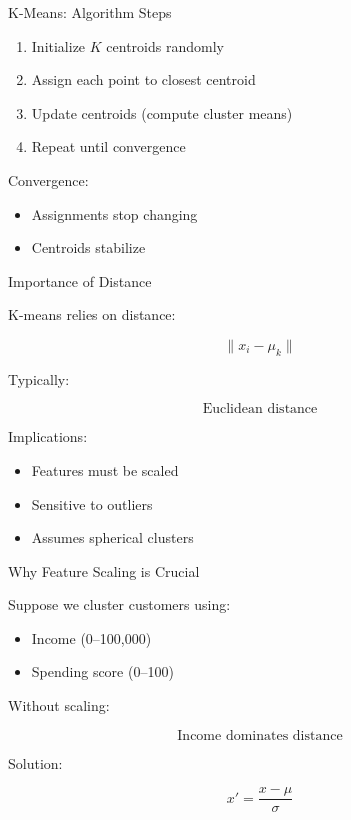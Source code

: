 \documentclass{beamer}
\begin{document}
\begin{frame}{K-Means: Algorithm Steps}

\begin{enumerate}
    \item Initialize $K$ centroids randomly
    \item Assign each point to closest centroid
    \item Update centroids (compute cluster means)
    \item Repeat until convergence
\end{enumerate}

\vspace{0.5cm}

Convergence:

\begin{itemize}
    \item Assignments stop changing
    \item Centroids stabilize
\end{itemize}

\end{frame}

\begin{frame}{Importance of Distance}

K-means relies on distance:

\[
\|x_i - \mu_k\|
\]

\vspace{0.5cm}

Typically:

\[
\text{Euclidean distance}
\]

\vspace{0.5cm}

Implications:

\begin{itemize}
    \item Features must be scaled
    \item Sensitive to outliers
    \item Assumes spherical clusters
\end{itemize}

\end{frame}

\begin{frame}{Why Feature Scaling is Crucial}

Suppose we cluster customers using:

\begin{itemize}
    \item Income (0–100,000)
    \item Spending score (0–100)
\end{itemize}

\vspace{0.5cm}

Without scaling:

\[
\text{Income dominates distance}
\]

\vspace{0.5cm}

Solution:

\[
x' = \frac{x - \mu}{\sigma}
\]

\end{frame}
\end{document}
